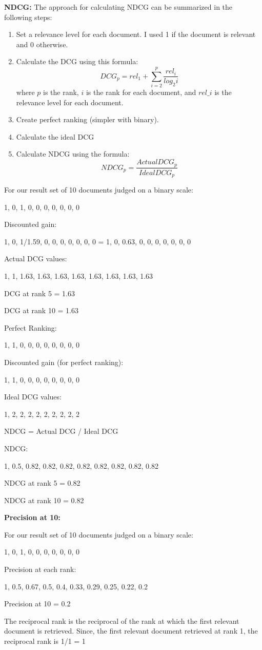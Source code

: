 \textbf{NDCG:}
The approach for calculating NDCG can be summarized in the following steps:
\begin{enumerate}
\item Set a relevance level for each document. I used 1 if the document is relevant and 0 otherwise.
\item Calculate the DCG using this formula: 
$$
DCG_p = rel_1 + \sum_{i=2}^p \frac{rel_i}{log_2i}
$$
where $p$ is the rank, $i$ is the rank for each document, and $rel\_i$ is the relevance level for each document. 
\item Create perfect ranking (simpler with binary).
\item Calculate the ideal DCG 
\item Calculate NDCG using the formula:
$$
NDCG_p = \frac{ActualDCG_p}{IdealDCG_p}
$$
\end{enumerate}

For our result set of 10 documents judged on a binary scale:

1, 0, 1, 0, 0, 0, 0, 0, 0, 0

Discounted gain:

1, 0, 1/1.59, 0, 0, 0, 0, 0, 0, 0 = 1, 0, 0.63, 0, 0, 0, 0, 0, 0, 0

Actual DCG values:

1, 1, 1.63, 1.63, 1.63, 1.63, 1.63, 1.63, 1.63, 1.63

DCG at rank 5 = 1.63

DCG at rank 10 = 1.63

Perfect Ranking:

1, 1, 0, 0, 0, 0, 0, 0, 0, 0

Discounted gain (for perfect ranking):

1, 1, 0, 0, 0, 0, 0, 0, 0, 0

Ideal DCG values:

1, 2, 2, 2, 2, 2, 2, 2, 2, 2 

NDCG = Actual DCG / Ideal DCG

NDCG:

1, 0.5, 0.82, 0.82, 0.82, 0.82, 0.82, 0.82, 0.82, 0.82

NDCG at rank 5 = 0.82

NDCG at rank 10 = 0.82

\textbf{Precision at 10:}

For our result set of 10 documents judged on a binary scale:

1, 0, 1, 0, 0, 0, 0, 0, 0, 0

Precision at each rank:

1, 0.5, 0.67, 0.5, 0.4, 0.33, 0.29, 0.25, 0.22, 0.2

Precision at 10 = 0.2


The reciprocal rank is the reciprocal of the rank at which the first relevant document is retrieved. Since, the first relevant document retrieved at rank 1, the reciprocal rank is 1/1 = 1
